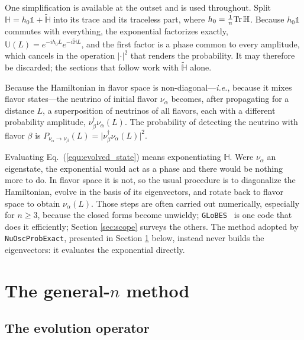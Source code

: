 \documentclass[final,5p,times,twocolumn,sort,compress]{elsarticle}
\newcommand{\ie}{{\it i.e.}}
\newcommand{\eq}{Eq.}
\newcommand{\equ}[1]{\eq~(\ref{equ:#1})}
\begin{document}
One simplification is available at the outset and is used throughout.  Split $\mathbb{H} = h_0 \mathbb{1} + \tilde{\mathbb{H}}$ into its trace and its traceless part, where $h_0 = \frac{1}{n}{\rm Tr}\,\mathbb{H}$.  Because $h_0 \mathbb{1}$ commutes with everything, the exponential factorizes exactly, $\mathbb{U}(L) = e^{-i h_0 L} e^{-i \tilde{\mathbb{H}} L}$, and the first factor is a phase common to every amplitude, which cancels in the operation $\lvert \cdot \rvert^2$ that renders the probability.  It may therefore be discarded; the sections that follow work with $\tilde{\mathbb{H}}$ alone.

Because the Hamiltonian in flavor space is non-diagonal---\ie, because it mixes flavor states---the neutrino of initial flavor $\nu_\alpha$ becomes, after propagating for a distance $L$, a superposition of neutrinos of all flavors, each with a different probability amplitude, $\nu_\beta^\dagger \nu_\alpha(L)$.  The probability of detecting the neutrino with flavor $\beta$ is $P_{\nu_\alpha \to \nu_\beta}(L) = \lvert \nu_\beta^\dagger \nu_\alpha(L) \rvert^2$.

Evaluating \equ{evolved_state} means exponentiating $\mathbb{H}$.  Were $\nu_\alpha$ an eigenstate, the exponential would act as a phase and there would be nothing more to do.  In flavor space it is not, so the usual procedure is to diagonalize the Hamiltonian, evolve in the basis of its eigenvectors, and rotate back to flavor space to obtain $\nu_\alpha(L)$.  Those steps are often carried out numerically, especially for $n \geq 3$, because the closed forms become unwieldy; {\tt GLoBES}\ \cite{GLoBES, Kopp:2006wp, Huber:2007ji} is one code that does it efficiently; Section \ref{sec:scope} surveys the others.  The method adopted by {\tt NuOscProbExact}, presented in Section \ref{sec:general_n} below, instead never builds the eigenvectors: it evaluates the exponential directly.


\section{The general-$n$ method}
\label{sec:general_n}


\subsection{The evolution operator}
\label{sec:evolution_operator}
\end{document}
